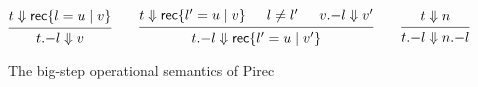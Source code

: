 \begin{figure}
\begin{gather*}
    \\
    \begin{prooftree}
      \hypo{t \Downarrow \RecordLit \{ l = u \mid v \}}
      \infer1{t \RecordRestr l \Downarrow v}
    \end{prooftree}
    \qquad
    \begin{prooftree}
      \hypo{t \Downarrow \RecordLit \{ l' = u \mid v \}}
      \hypo{l \neq l'}
      \hypo{v \RecordRestr l \Downarrow v'}
      \infer3{t \RecordRestr l \Downarrow \RecordLit \{ l' = u \mid v' \}}
    \end{prooftree}
    \qquad
    \begin{prooftree}
      \hypo{t \Downarrow n}
      \infer1{t \RecordRestr l \Downarrow n \RecordRestr l}
    \end{prooftree}
  \end{gather*}
  \caption{The big-step operational semantics of Pirec}\label{fig:big-step}
\end{figure}
